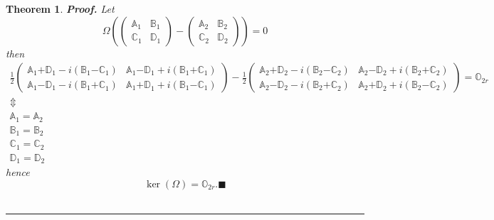 \documentclass[aps,preprint]{revtex4}
\newtheorem{theorem}{Theorem}
\newenvironment{proof}[1][Proof]{\noindent\textbf{#1.} }{\ \rule{0.5em}{0.5em}}
\begin{document}
\begin{theorem}
\begin{proof}
Let 
\begin{equation}
\Omega \left( \left( 
\begin{array}{cc}
\mathbb{A}_{1} & \mathbb{B}_{1} \\ 
\mathbb{C}_{1} & \mathbb{D}_{1}%
\end{array}%
\right) -\left( 
\begin{array}{cc}
\mathbb{A}_{2} & \mathbb{B}_{2} \\ 
\mathbb{C}_{2} & \mathbb{D}_{2}%
\end{array}%
\right) \right) =0
\end{equation}%
then 
\begin{gather}
\frac{1}{2}\left( 
\begin{array}{cc}
\mathbb{A}_{1}\mathbb{+D}_{1}-i\left( \mathbb{B}_{1}\mathbb{-C}_{1}\right) & 
\mathbb{A}_{1}\mathbb{-D}_{1}+i\left( \mathbb{B}_{1}\mathbb{+C}_{1}\right)
\\ 
\mathbb{A}_{1}\mathbb{-D}_{1}-i\left( \mathbb{B}_{1}\mathbb{+C}_{1}\right) & 
\mathbb{A}_{1}\mathbb{+D}_{1}+i\left( \mathbb{B}_{1}\mathbb{-C}_{1}\right)%
\end{array}%
\right) -\frac{1}{2}\left( 
\begin{array}{cc}
\mathbb{A}_{2}\mathbb{+D}_{2}-i\left( \mathbb{B}_{2}\mathbb{-C}_{2}\right) & 
\mathbb{A}_{2}\mathbb{-D}_{2}+i\left( \mathbb{B}_{2}\mathbb{+C}_{2}\right)
\\ 
\mathbb{A}_{2}\mathbb{-D}_{2}-i\left( \mathbb{B}_{2}\mathbb{+C}_{2}\right) & 
\mathbb{A}_{2}\mathbb{+D}_{2}+i\left( \mathbb{B}_{2}\mathbb{-C}_{2}\right)%
\end{array}%
\right) =\mathbb{O}_{2r} \\
\Updownarrow \\
\mathbb{A}_{1}=\mathbb{A}_{2} \\
\mathbb{B}_{1}=\mathbb{B}_{2} \\
\mathbb{C}_{1}=\mathbb{C}_{2} \\
\mathbb{D}_{1}=\mathbb{D}_{2}
\end{gather}%
hence 
\begin{equation}
\ker \left( \Omega \right) =\mathbb{O}_{2r}.\blacksquare
\end{equation}
\end{proof}
\end{theorem}
\end{document}
